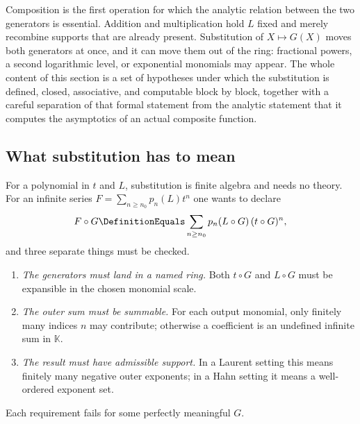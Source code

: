 \documentclass[11pt,oneside]{article}
\theoremstyle{plain}
\theoremstyle{definition}
\theoremstyle{remark}
\newcommand{\K}{\mathbb{K}}
\newcommand{\compose}{\mathbin{\circ}}
\begin{document}
Composition is the first operation for which the analytic relation between the
two generators is essential.  Addition and multiplication hold \(L\) fixed and
merely recombine supports that are already present.  Substitution of
\(X\mapsto G(X)\) moves both generators at once, and it can move them out of
the ring: fractional powers, a second logarithmic level, or exponential
monomials may appear.  The whole content of this section is a set of
hypotheses under which the substitution is defined, closed, associative, and
computable block by block, together with a careful separation of that formal
statement from the analytic statement that it computes the asymptotics of an
actual composite function.

\subsection{What substitution has to mean}
\label{plt:sec:cmp-what-substitution-means}

For a polynomial in \(t\) and \(L\), substitution is finite algebra and needs
no theory.  For an infinite series
\(F=\sum_{n\ge n_0}p_n(L)t^n\) one wants to declare
\[
 F\compose G
 \DefinitionEquals
 \sum_{n\ge n_0}p_n(L\compose G)\,(t\compose G)^n,
\]
and three separate things must be checked.

\begin{enumerate}
\item \emph{The generators must land in a named ring.}  Both \(t\compose G\)
and \(L\compose G\) must be expansible in the chosen monomial scale.
\item \emph{The outer sum must be summable.}  For each output monomial, only
finitely many indices \(n\) may contribute; otherwise a coefficient is an
undefined infinite sum in \(\K\).
\item \emph{The result must have admissible support.}  In a Laurent setting
this means finitely many negative outer exponents; in a Hahn setting it means
a well-ordered exponent set.
\end{enumerate}

Each requirement fails for some perfectly meaningful \(G\).
\end{document}
